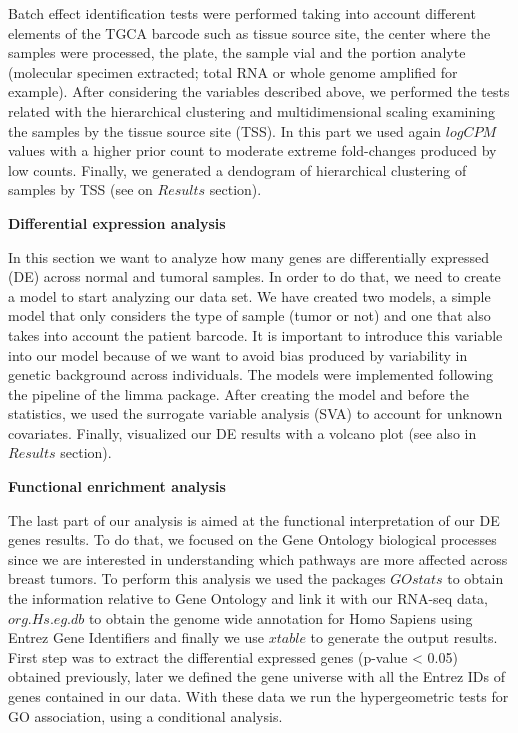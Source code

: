 \documentclass[9pt,twocolumn,twoside]{gsajnl}
\begin{document}
Batch effect identification tests were performed taking into account different elements of the TGCA barcode such as tissue source site, the center where the samples were processed, the plate, the sample vial and the portion analyte (molecular specimen extracted; total RNA or whole genome amplified for example). After considering the variables described above, we performed the tests related with the hierarchical clustering and multidimensional scaling examining the samples by the tissue source site (TSS). In this part we used again $log CPM$ values with a higher prior count to moderate extreme fold-changes produced by low counts. Finally, we generated a dendogram of hierarchical clustering of samples by TSS (see on $Results$ section). 
\vspace{2mm}

\textbf{Differential expression analysis}
\vspace{2mm}

In this section we want to analyze how many genes are differentially expressed (DE) across normal and tumoral samples. In order to do that, we need to create a model to start analyzing our data set. We have created two models, a simple model that only considers the type of sample (tumor or not) and one that also takes into account the patient barcode. It is important to introduce this variable into our model because of we want to avoid bias produced by variability in genetic background across individuals. The models were implemented following the pipeline of the limma package. After creating the model and before the statistics, we used the surrogate variable analysis (SVA) to account for unknown covariates. Finally, visualized our DE results with a volcano plot (see also in $Results$ section).
\vspace{4mm}

\textbf{Functional enrichment analysis}
\vspace{2mm}

The last part of our analysis is aimed at the functional interpretation of our DE genes results. To do that, we focused on the Gene Ontology biological processes since we are interested in understanding which pathways are more affected across breast tumors. To perform this analysis we used the packages $GOstats$ to obtain the information relative to Gene Ontology and link it with our RNA-seq data, $org.Hs.eg.db$ to obtain the genome wide annotation for Homo Sapiens using Entrez Gene Identifiers and finally we use $xtable$ to generate the output results. First step was to extract the differential expressed genes (p-value < 0.05) obtained previously, later we defined the gene universe with all the Entrez IDs of genes contained in our data. With these data we run the hypergeometric tests for GO association, using a conditional analysis.
\vspace{2mm}
\end{document}
